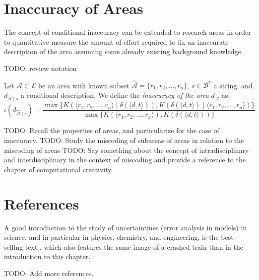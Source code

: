 %
%

\section{Inaccuracy of Areas}

The concept of conditional inaccuracy can be extended to research areas in order to quantitative measure the amount of effort required to fix an inaccurate description of the area assuming some already existing background knowledge.

{\color{red} TODO: review notation}

\begin{definition}
Let $\mathcal{A} \subset \mathcal{E}$ be an area with known subset $\hat{\mathcal{A}} = \{r_1, r_2, \ldots, r_n\}$, $s \in \mathcal{B}^\ast$ a string, and $d_{\hat{\mathcal{A}} \mid s}$ a condtional description. We define the \emph{inaccuracy of the area} $d_{\hat{\mathcal{A}}}$ as:
\[
\iota(d_{\hat{\mathcal{A}} \mid s}) = \frac{ \max\{ K \left( \langle r_1, r_2, \ldots, r_n \rangle \mid \delta(\langle d, t \rangle) \right), K \left( \delta(\langle d, t \rangle) \mid \langle r_1, r_2, \ldots, r_n \rangle \right) \} } { \max\{ K(\langle r_1, r_2, \ldots, r_n \rangle), K \left(\delta(\langle d, t \rangle) \right) \} }
\]
\end{definition}

{\color{red}

TODO: Recall the properties of areas, and particularize for the case of inaccuracy.
TODO: Study the miscoding of subareas of areas in relation to the miscoding of areas
TODO: Say something about the concept of intradisciplinary and interdisciplinary in the context
of miscoding and provide a reference to the chapter of computational creativity.

}

%
%

\section*{References}

A good introduction to the study of uncertaintines (error analysis in models) in science, and in particular in physics, chemistry, and engineering, is the best-selling text \cite{taylor2022introduction}, which also features the same image of a crashed train than in the introduction to this chapter.

{\color{red} TODO: Add more references.}


